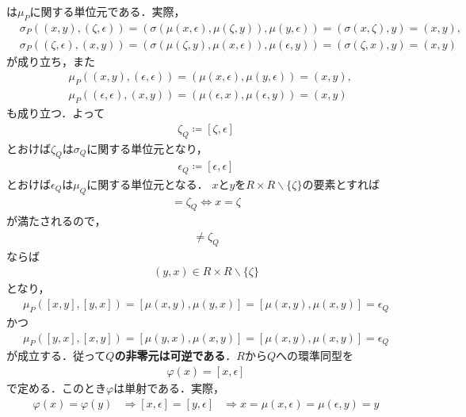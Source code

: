 	は$\mu_P$に関する単位元である．実際，
	\begin{align}
		&\sigma_P((x,y),(\zeta,\epsilon))
		= (\sigma(\mu(x,\epsilon),\mu(\zeta,y)),\mu(y,\epsilon))
		= (\sigma(x,\zeta),y)
		= (x,y), \\
		&\sigma_P((\zeta,\epsilon),(x,y))
		= (\sigma(\mu(\zeta,y),\mu(x,\epsilon)),\mu(\epsilon,y))
		= (\sigma(\zeta,x),y)
		= (x,y)
	\end{align}
	が成り立ち，また
	\begin{align}
		&\mu_P((x,y),(\epsilon,\epsilon)) = (\mu(x,\epsilon),\mu(y,\epsilon)) = (x,y), \\
		&\mu_P((\epsilon,\epsilon),(x,y)) = (\mu(\epsilon,x),\mu(\epsilon,y)) = (x,y)
	\end{align}
	も成り立つ．よって
	\begin{align}
		\zeta_Q \coloneqq [\zeta,\epsilon]
	\end{align}
	とおけば$\zeta_Q$は$\sigma_Q$に関する単位元となり，
	\begin{align}
		\epsilon_Q \coloneqq [\epsilon,\epsilon]
	\end{align}
	とおけば$\epsilon_Q$は$\mu_Q$に関する単位元となる．
	$x$と$y$を$R \times R \backslash \{\zeta\}$の要素とすれば
	\begin{align}
		[x,y] = \zeta_Q \Longleftrightarrow x = \zeta
	\end{align}
	が満たされるので，
	\begin{align}
		[x,y] \neq \zeta_Q
	\end{align}
	ならば
	\begin{align}
		(y,x) \in R \times R \backslash \{\zeta\}
	\end{align}
	となり，
	\begin{align}
		\mu_P([x,y],[y,x]) = [\mu(x,y),\mu(y,x)] = [\mu(x,y),\mu(x,y)] = \epsilon_Q
	\end{align}
	かつ
	\begin{align}
		\mu_P([y,x],[x,y]) = [\mu(y,x),\mu(x,y)] = [\mu(x,y),\mu(x,y)] = \epsilon_Q
	\end{align}
	が成立する．従って{\bf $Q$の非零元は可逆である}．$R$から$Q$への環準同型を
	\begin{align}
		\varphi(x) = [x,\epsilon]
	\end{align}
	で定める．このとき$\varphi$は単射である．実際，
	\begin{align}
		\varphi(x) = \varphi(y) &\Longrightarrow [x,\epsilon] = [y,\epsilon]
		&\Longrightarrow x = \mu(x,\epsilon) = \mu(\epsilon,y) = y
	\end{align}
